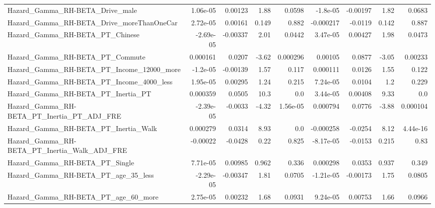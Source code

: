\begin{tabular}{lrrrrrrrr}
Hazard\_Gamma\_RH-BETA\_Drive\_male                    &    1.06e-05 &      0.00123 &     1.88 &   0.0598 &   -1.8e-05 &    -0.00197 &         1.82 &        0.0683 \\
Hazard\_Gamma\_RH-BETA\_Drive\_moreThanOneCar          &    2.72e-05 &      0.00161 &    0.149 &    0.882 &  -0.000217 &     -0.0119 &        0.142 &         0.887 \\
Hazard\_Gamma\_RH-BETA\_PT\_Chinese                    &   -2.69e-05 &     -0.00337 &     2.01 &   0.0442 &   3.47e-05 &     0.00427 &         1.98 &        0.0473 \\
Hazard\_Gamma\_RH-BETA\_PT\_Commute                    &    0.000161 &       0.0207 &    -3.62 & 0.000296 &    0.00105 &      0.0877 &        -3.05 &       0.00233 \\
Hazard\_Gamma\_RH-BETA\_PT\_Income\_12000\_more          &    -1.2e-05 &     -0.00139 &     1.57 &    0.117 &   0.000111 &      0.0126 &         1.55 &         0.122 \\
Hazard\_Gamma\_RH-BETA\_PT\_Income\_4000\_less           &    1.95e-05 &      0.00295 &     1.24 &    0.215 &   7.24e-05 &      0.0104 &          1.2 &         0.229 \\
Hazard\_Gamma\_RH-BETA\_PT\_Inertia\_PT                 &    0.000359 &       0.0505 &     10.3 &      0.0 &   3.44e-05 &     0.00408 &         9.33 &           0.0 \\
Hazard\_Gamma\_RH-BETA\_PT\_Inertia\_PT\_ADJ\_FRE         &   -2.39e-05 &      -0.0033 &    -4.32 & 1.56e-05 &   0.000794 &      0.0776 &        -3.88 &      0.000104 \\
Hazard\_Gamma\_RH-BETA\_PT\_Inertia\_Walk               &    0.000279 &       0.0314 &     8.93 &      0.0 &  -0.000258 &     -0.0254 &         8.12 &      4.44e-16 \\
Hazard\_Gamma\_RH-BETA\_PT\_Inertia\_Walk\_ADJ\_FRE       &    -0.00022 &      -0.0428 &     0.22 &    0.825 &  -8.17e-05 &     -0.0153 &        0.215 &          0.83 \\
Hazard\_Gamma\_RH-BETA\_PT\_Single                     &    7.71e-05 &      0.00985 &    0.962 &    0.336 &   0.000298 &      0.0353 &        0.937 &         0.349 \\
Hazard\_Gamma\_RH-BETA\_PT\_age\_35\_less                &   -2.29e-05 &     -0.00347 &     1.81 &   0.0705 &  -1.21e-05 &    -0.00173 &         1.75 &        0.0805 \\
Hazard\_Gamma\_RH-BETA\_PT\_age\_60\_more                &    2.75e-05 &      0.00232 &     1.68 &   0.0931 &   9.24e-05 &     0.00753 &         1.66 &        0.0966 \\

\end{tabular}
